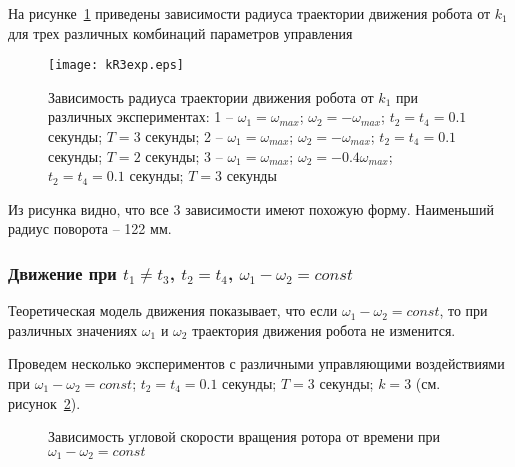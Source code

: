 На рисунке~\ref{kR3exp} приведены зависимости радиуса траектории движения робота от $k_1$ для трех различных комбинаций параметров управления

\begin{figure}[!ht]
	\centering
	\texttt{[image: kR3exp.eps]}
	\caption{Зависимость радиуса траектории движения робота от $k_1$ при различных экспериментах: 1 -- $\omega_1 = \omega_{max} $; $ \omega_2 = -\omega_{max} $; $ t_2=t_4=0.1 $ секунды; $ T = 3 $ секунды; 2 -- $\omega_1 = \omega_{max} $; $ \omega_2 = -\omega_{max} $; $ t_2=t_4=0.1 $ секунды; $ T = 2 $ секунды; 3 -- $\omega_1 = \omega_{max} $; $ \omega_2 = -0.4\omega_{max} $; $ t_2=t_4=0.1 $ секунды; $ T = 3 $ секунды }
	\label{kR3exp}
\end{figure}

Из рисунка видно, что все 3 зависимости имеют похожую форму. Наименьший радиус поворота -- 122 мм.

\subsubsection{Движение при $ t_1 \neq t_3 $, $ t_2 = t_4 $, $ \omega_1 - \omega_2 = const $}


Теоретическая модель движения показывает, что если $ \omega_1 - \omega_2 = const $, то при различных значениях $ \omega_1 $ и $ \omega_2 $ траектория движения робота не изменится.

Проведем несколько экспериментов с различными управляющими воздействиями при $ \omega_1 - \omega_2 = const $; $ t_2=t_4=0.1 $ секунды; $ T = 3 $ секунды; $ k=3 $ (см. рисунок~\ref{ControlActionDifferentAmp}).

\begin{figure}[!ht]
	\begin{minipage}[h]{0.3\linewidth}
	\end{minipage}
	\hfill
	\begin{minipage}[h]{0.3\linewidth}
	\end{minipage}
	\hfill
	\begin{minipage}[h]{0.3\linewidth}
	\end{minipage}
	\caption{Зависимость угловой скорости вращения ротора от времени при $ \omega_1 - \omega_2 = const $}
	\label{ControlActionDifferentAmp}
\end{figure}

